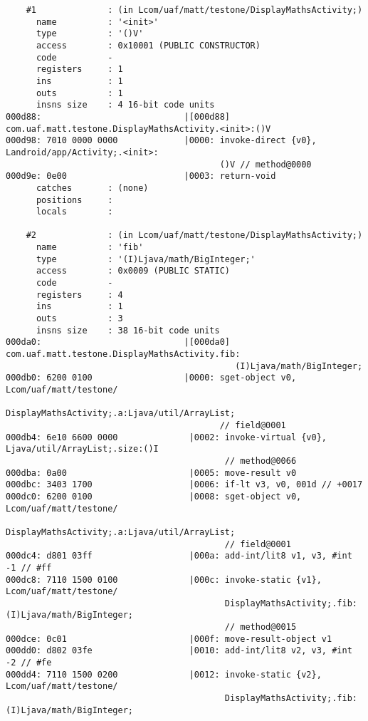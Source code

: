 \begin{lstlisting}
    #1              : (in Lcom/uaf/matt/testone/DisplayMathsActivity;)
      name          : '<init>'
      type          : '()V'
      access        : 0x10001 (PUBLIC CONSTRUCTOR)
      code          -
      registers     : 1
      ins           : 1
      outs          : 1
      insns size    : 4 16-bit code units
000d88:                            |[000d88] com.uaf.matt.testone.DisplayMathsActivity.<init>:()V
000d98: 7010 0000 0000             |0000: invoke-direct {v0}, Landroid/app/Activity;.<init>:
                                          ()V // method@0000
000d9e: 0e00                       |0003: return-void
      catches       : (none)
      positions     :
      locals        :

    #2              : (in Lcom/uaf/matt/testone/DisplayMathsActivity;)
      name          : 'fib'
      type          : '(I)Ljava/math/BigInteger;'
      access        : 0x0009 (PUBLIC STATIC)
      code          -
      registers     : 4
      ins           : 1
      outs          : 3
      insns size    : 38 16-bit code units
000da0:                            |[000da0] com.uaf.matt.testone.DisplayMathsActivity.fib:
                                             (I)Ljava/math/BigInteger;
000db0: 6200 0100                  |0000: sget-object v0, Lcom/uaf/matt/testone/
                                          DisplayMathsActivity;.a:Ljava/util/ArrayList;
                                          // field@0001
000db4: 6e10 6600 0000              |0002: invoke-virtual {v0}, Ljava/util/ArrayList;.size:()I
                                           // method@0066
000dba: 0a00                        |0005: move-result v0
000dbc: 3403 1700                   |0006: if-lt v3, v0, 001d // +0017
000dc0: 6200 0100                   |0008: sget-object v0, Lcom/uaf/matt/testone/
                                           DisplayMathsActivity;.a:Ljava/util/ArrayList;
                                           // field@0001
000dc4: d801 03ff                   |000a: add-int/lit8 v1, v3, #int -1 // #ff
000dc8: 7110 1500 0100              |000c: invoke-static {v1}, Lcom/uaf/matt/testone/
                                           DisplayMathsActivity;.fib:(I)Ljava/math/BigInteger;
                                           // method@0015
000dce: 0c01                        |000f: move-result-object v1
000dd0: d802 03fe                   |0010: add-int/lit8 v2, v3, #int -2 // #fe
000dd4: 7110 1500 0200              |0012: invoke-static {v2}, Lcom/uaf/matt/testone/
                                           DisplayMathsActivity;.fib:(I)Ljava/math/BigInteger;

\end{lstlisting}
